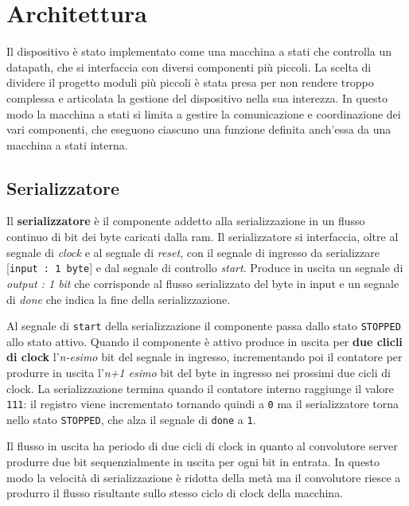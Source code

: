 \documentclass[a4paper]{report}
\begin{document}
\chapter{Architettura}
Il dispositivo è stato implementato come una macchina a stati che controlla un datapath, che si interfaccia con diversi componenti più piccoli. La scelta di dividere il progetto moduli più piccoli è stata presa per non rendere troppo complessa e articolata la gestione del dispositivo nella sua interezza. In questo modo la macchina a stati si limita a gestire la comunicazione e coordinazione dei vari componenti, che eseguono ciascuno una funzione definita anch'essa da una macchina a stati interna.

\section{Serializzatore}

Il \textbf{serializzatore} è il componente addetto alla serializzazione in un flusso continuo di bit dei byte caricati dalla ram.
Il serializzatore si interfaccia, oltre al segnale di \textit{clock} e al segnale di \textit{reset}, con il segnale di ingresso da serializzare [\texttt{input : 1 byte}] e dal segnale di controllo \textit{start}. Produce in uscita un segnale di \textit{output : 1 bit} che corrisponde al flusso serializzato del byte in input e un segnale di \textit{done} che indica la fine della serializzazione.

Al segnale di \texttt{start} della serializzazione il componente passa dallo stato \texttt{STOPPED} allo stato attivo. Quando il componente è attivo produce in uscita per \textbf{due clicli di clock} l'\textit{n-esimo} bit del segnale in ingresso, incrementando poi il contatore per produrre in uscita l'\textit{n+1 esimo} bit del byte in ingresso nei prossimi due cicli di clock. La serializzazione termina quando il contatore interno raggiunge il valore \texttt{111}: il registro viene incrementato tornando quindi a \texttt{0} ma il serializzatore torna nello stato \texttt{STOPPED}, che alza il segnale di \texttt{done} a \texttt{1}.

Il flusso in uscita ha periodo di due cicli di clock in quanto al convolutore server produrre due bit sequenzialmente in uscita per ogni bit in entrata. In questo modo la velocità di serializzazione è ridotta della metà ma il convolutore riesce a produrro il flusso risultante sullo stesso ciclo di clock della macchina.
\end{document}
